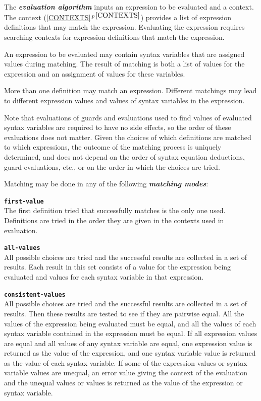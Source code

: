 \documentclass[12pt]{article}
\makeatletter
\newcommand{\TT}[1]{{\tt \bfseries #1}}
\newcommand{\key}[1]{{\bf \em #1}\index{#1}}
\newcommand{\skey}[2]{{\bf \em #1#2}\index{#1}}
\newcommand{\ttkey}[1]{\TT{#1}\index{#1@{\tt #1}}}
\newcommand{\secref}[1]{\ref{#1}$\,^{p\,\pageref{#1}}$}
\makeatother
\begin{document}
The \key{evaluation algorithm} inputs an expression to be evaluated
and a context.  The context (\secref{CONTEXTS}) provides a list of expression
definitions that may match the expression.  Evaluating the expression
requires searching contexts for expression definitions that match the
expression.

An expression to be evaluated may contain syntax variables that are assigned
values during matching.  The result of matching is both a list of values for
the expression and an assignment of values for these variables.

More than one definition may match an expression.  Different matchings
may lead to different expression values and values of syntax variables
in the expression.

Note that evaluations of guards and evaluations
used to find values of evaluated syntax variables are required to have
no side effects, so the order of these evaluations does not matter.
Given the choices of which definitions are matched to which expressions,
the outcome of the matching process is uniquely determined, and does not
depend on the order of syntax equation deductions, guard evaluations, etc.,
or on the order in which the choices are tried.

Matching may be done in any of the following \skey{matching mode}s:

\begin{list}{}{}

\item[\ttkey{first-value}]~\\
The first definition tried that successfully matches is the only one
used.  Definitions are tried in the order they are given in the contexts
used in evaluation.

\item[\ttkey{all-values}]~\\
All possible choices are tried and the
successful results are collected in a set of results.  Each result
in this set consists of a value for the expression being evaluated
and values for each syntax variable in that expression.

\item[\ttkey{consistent-values}]~\\
All possible choices are tried and the
successful results are collected in a set of results.  Then these results
are tested to see if they are pairwise equal.
All the values of the expression
being evaluated must be equal, and all the values of each syntax variable
contained in the expression must be equal.  If all expression values are
equal and all values of any syntax variable are equal,
one expression value
is returned as the value of the expression, and one syntax variable value
is returned as the value of each syntax variable.
If some of the expression values or syntax variable values are unequal, an
error value giving the context of the evaluation and the unequal values
or values is returned as the value of the expression or syntax variable.

\end{list}
\end{document}
